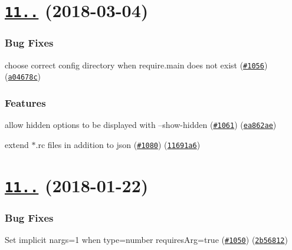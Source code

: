 \label{_11.1.0}%
 \section*{\href{https://github.com/yargs/yargs/compare/v11.0.0...v11.1.0}{\tt 11..} (2018-\/03-\/04)}

\subsubsection*{Bug Fixes}


\begin{DoxyItemize}
\item choose correct config directory when require.\+main does not exist (\href{https://github.com/yargs/yargs/issues/1056}{\tt \#1056}) (\href{https://github.com/yargs/yargs/commit/a04678c}{\tt a04678c})
\end{DoxyItemize}

\subsubsection*{Features}


\begin{DoxyItemize}
\item allow hidden options to be displayed with --show-\/hidden (\href{https://github.com/yargs/yargs/issues/1061}{\tt \#1061}) (\href{https://github.com/yargs/yargs/commit/ea862ae}{\tt ea862ae})
\item extend $\ast$.rc files in addition to json (\href{https://github.com/yargs/yargs/issues/1080}{\tt \#1080}) (\href{https://github.com/yargs/yargs/commit/11691a6}{\tt 11691a6})
\end{DoxyItemize}

\label{_11.0.0}%
 \section*{\href{https://github.com/yargs/yargs/compare/v10.1.2...v11.0.0}{\tt 11..} (2018-\/01-\/22)}

\subsubsection*{Bug Fixes}


\begin{DoxyItemize}
\item Set implicit nargs=1 when type=number requires\+Arg=true (\href{https://github.com/yargs/yargs/issues/1050}{\tt \#1050}) (\href{https://github.com/yargs/yargs/commit/2b56812}{\tt 2b56812})
\end{DoxyItemize}

